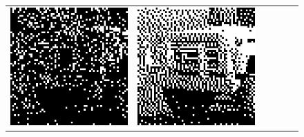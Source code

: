 \begin{figure}
\begin{tabular}{c c c c c c}
		\includegraphics[width=\tilewidth,interpolate=false]{media/chp2/associative_memory/binam/03_01_noise_scaled_crushed.png}&%
		\includegraphics[width=\tilewidth,interpolate=false]{media/chp2/associative_memory/binam/03_02_out_scaled_crushed.png}\\

\end{tabular}
\end{figure}
